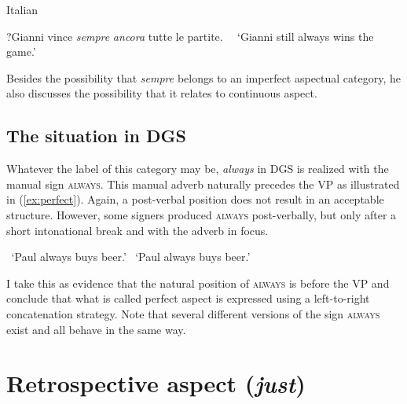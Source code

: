 \begin{exe}
\ex Italian \citep[96]{cinque1999adverbs}\begin{xlist} 
\ex *?{{Gianni vince \textit{sempre} \textit{ancora} tutte le partite.}
\glt \textcolor{white}{*?}`Gianni still always wins the game.' \label{ex:perfectb}}
\end{xlist}
\end{exe} 

\noindent Besides the possibility that \textit{sempre} belongs to an imperfect aspectual category, he also discusses the possibility that it relates to continuous aspect. 

\subsection{The situation in DGS}
Whatever the label of this category may be, \textit{always} in DGS is realized with the manual sign \textsc{always}. This manual adverb naturally precedes the VP as illustrated in (\ref{ex:perfect}). Again, a post-verbal position does not result in an acceptable structure. However, some signers produced \textsc{always} post-verbally, but only after a short intonational break and with the adverb in focus.  

\begin{exe}
\ex\label{alwaysbeerbuy}\begin{xlist}
\glt \textcolor{white}{?}`Paul always buys beer.' \label{ex:perfect}
\glt \textcolor{white}{?}`Paul always buys beer.' \label{ex:perfectb}
\end{xlist}
\end{exe} 

\noindent I take this as evidence that the natural position of \textsc{always} is before the VP and conclude that what is called perfect aspect is expressed using a left-to-right concatenation strategy. Note that several different versions of the sign \textsc{always} exist and all behave in the same way.






\section{Retrospective aspect (\textit{just})}\label{justjust}
